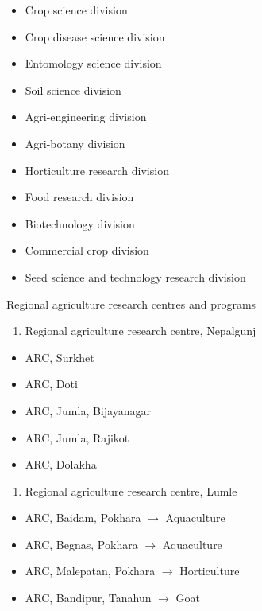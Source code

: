 \documentclass[
]{book}
\providecommand{\tightlist}{%
  \setlength{\itemsep}{0pt}\setlength{\parskip}{0pt}}
\begin{document}
\begin{itemize}
  \begin{itemize}
  \tightlist
  \item
    Crop science division
  \item
    Crop disease science division
  \item
    Entomology science division
  \item
    Soil science division
  \item
    Agri-engineering division
  \item
    Agri-botany division
  \item
    Horticulture research division
  \item
    Food research division
  \item
    Biotechnology division
  \item
    Commercial crop division
  \item
    Seed science and technology research division
  \end{itemize}
\end{itemize}

Regional agriculture research centres and programs

\begin{enumerate}
\def\labelenumi{\arabic{enumi}.}
\tightlist
\item
  Regional agriculture research centre, Nepalgunj
\end{enumerate}

\begin{itemize}
\tightlist
\item
  ARC, Surkhet
\item
  ARC, Doti
\item
  ARC, Jumla, Bijayanagar
\item
  ARC, Jumla, Rajikot
\item
  ARC, Dolakha
\end{itemize}

\begin{enumerate}
\def\labelenumi{\arabic{enumi}.}
\setcounter{enumi}{1}
\tightlist
\item
  Regional agriculture research centre, Lumle
\end{enumerate}

\begin{itemize}
\tightlist
\item
  ARC, Baidam, Pokhara \(\rightarrow\) Aquaculture
\item
  ARC, Begnas, Pokhara \(\rightarrow\) Aquaculture
\item
  ARC, Malepatan, Pokhara \(\rightarrow\) Horticulture
\item
  ARC, Bandipur, Tanahun \(\rightarrow\) Goat
\end{itemize}
\end{document}
